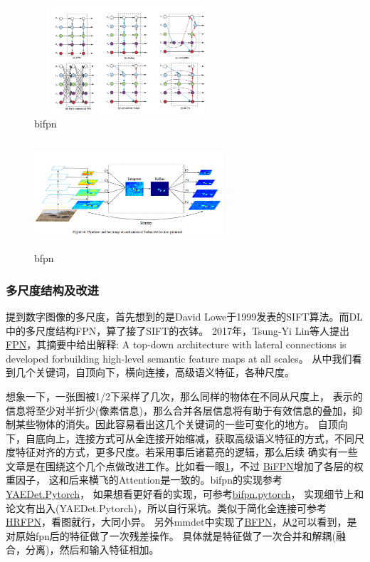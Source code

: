 \documentclass[UTF8]{ctexart}
\begin{document}
\begin{figure}[htbp]
	\centering
	\includegraphics[width=7cm,height=4cm]{./pic/BiFPN.png}
	\caption{bifpn}
	\label{picbifpn}
\end{figure}

\begin{figure}[htbp]
	\centering
	\includegraphics[width=7cm,height=4cm]{./pic/BFPN.png}
	\caption{bfpn}
	\label{picbfpn}
\end{figure}

\subsubsection{多尺度结构及改进}
提到数字图像的多尺度，首先想到的是David Lowe于1999发表的SIFT算法。而DL中的多尺度结构FPN，算了接了SIFT的衣钵。
2017年，Tsung-Yi Lin等人提出\href{https://arxiv.org/abs/1612.03144}{FPN}，其摘要中给出解释:
A top-down architecture with lateral connections is developed forbuilding high-level semantic feature maps at all scales。
从中我们看到几个关键词，自顶向下，横向连接，高级语义特征，各种尺度。

想象一下，一张图被1/2下采样了几次，那么同样的物体在不同从尺度上，
表示的信息将至少对半折少(像素信息)，那么合并各层信息将有助于有效信息的叠加，抑制某些物体的消失。因此容易看出这几个关键词的一些可变化的地方。
自顶向下，自底向上，连接方式可从全连接开始缩减，获取高级语义特征的方式，不同尺度特征对齐的方式，更多尺度。若采用事后诸葛亮的逻辑，那么后续
确实有一些文章是在围绕这个几个点做改进工作。比如看一眼\ref{picbifpn}，不过 \href{https://arxiv.org/abs/1911.09070}{BiFPN}增加了各层的权重因子，
这和后来横飞的Attention是一致的。bifpn的实现参考\href{https://github.com/zylo117/Yet-Another-EfficientDet-Pytorch}{YAEDet.Pytorch}，
如果想看更好看的实现，可参考\href{https://github.com/toandaominh1997/EfficientDet.Pytorch/blob/master/models/bifpn.py}{bifpn.pytorch}，
实现细节上和论文有出入(YAEDet.Pytorch)，所以自行采坑。类似于简化全连接可参考\href{https://arxiv.org/abs/1904.04514}{HRFPN}，看图就行，大同小异。
另外mmdet中实现了\href{https://arxiv.org/pdf/1904.02701.pdf}{BFPN}，从\ref{picbfpn}可以看到，是对原始fpn后的特征做了一次残差操作。
具体就是特征做了一次合并和解耦(融合，分离)，然后和输入特征相加。
\end{document}
